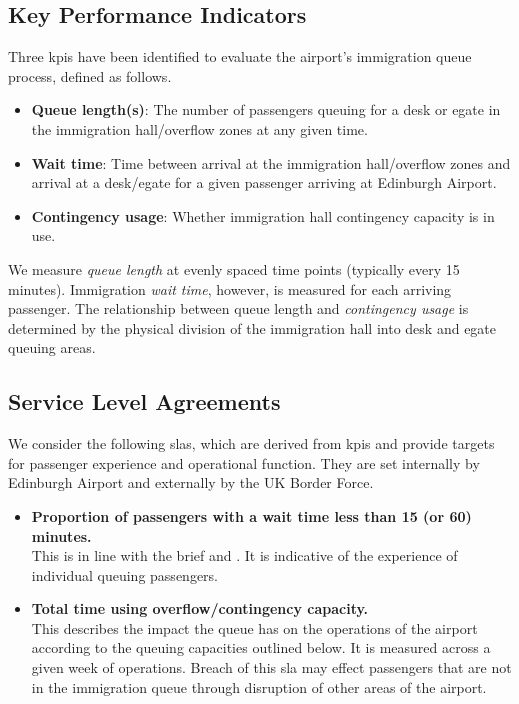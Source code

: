 \documentclass[10pt]{article}
\begin{document}
\subsection{Key Performance Indicators} \label{sec_kpi}

Three \glspl{kpi} have been identified to evaluate the airport's immigration queue process, defined as follows.

\begin{itemize}
    \item \textbf{Queue length(s)}: The number of passengers queuing for a desk or \gls{egate} in the immigration hall/overflow zones at any given time.
    \item \textbf{Wait time}: Time between arrival at the immigration hall/overflow zones and arrival at a desk/\gls{egate} for a given passenger arriving at Edinburgh Airport. 
    \item \textbf{Contingency usage}: Whether immigration hall contingency capacity is in use.
\end{itemize}

We measure \textit{queue length} at evenly spaced time points (typically every 15 minutes). Immigration \textit{wait time}, however, is measured for each arriving passenger. The relationship between queue length and \textit{contingency usage} is determined by the physical division of the immigration hall into desk and \gls{egate} queuing areas.

\subsection{Service Level Agreements} \label{sec_sla}
We consider the following \glspl{sla}, which are derived from \glspl{kpi} and provide targets for passenger experience and operational function. They are set internally by Edinburgh Airport and externally by the UK Border Force. 
\begin{itemize}
    \item \textbf{Proportion of passengers with a wait time less than 15 (or 60) minutes.} \\
    This is in line with the brief and \cite{UK_border_2025}. It is indicative of the experience of individual queuing passengers.
    \item \textbf{Total time using overflow/contingency capacity.} \\
    This describes the impact the queue has on the operations of the airport according to the queuing capacities outlined below. It is measured across a given week of operations. Breach of this \gls{sla} may effect passengers that are not in the immigration queue through disruption of other areas of the airport.
\end{itemize}
\end{document}
